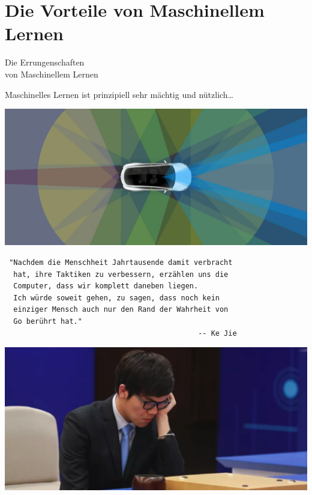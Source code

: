 \documentclass[aspectratio=43,x11names]{beamer}
\begin{document}

\section{Die Vorteile von Maschinellem Lernen}

\begin{frame}
\begin{center}
\huge
Die Errungenschaften\\von Maschinellem Lernen
\end{center}
\end{frame}

\begin{frame}
Maschinelles Lernen ist prinzipiell sehr mächtig und nützlich\dots

\begin{center}
\includegraphics[scale=0.105]{images/autopilotnew.jpg} 
\end{center}
\end{frame}

\begin{frame}[fragile]
\small
\begin{verbatim}
 "Nachdem die Menschheit Jahrtausende damit verbracht
  hat, ihre Taktiken zu verbessern, erzählen uns die
  Computer, dass wir komplett daneben liegen.
  Ich würde soweit gehen, zu sagen, dass noch kein 
  einziger Mensch auch nur den Rand der Wahrheit von
  Go berührt hat."
                                             -- Ke Jie
\end{verbatim}

\begin{center}
\includegraphics[scale=0.65]{images/kejie.png} 
\end{center}
\end{frame}
\end{document}
